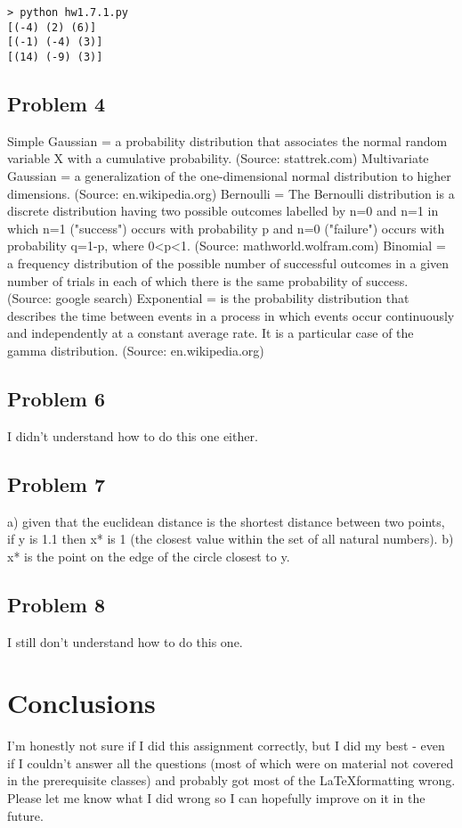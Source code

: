 \documentclass[a4paper]{article}
\begin{document}
\begin{lstlisting}
> python hw1.7.1.py 
[(-4) (2) (6)]
[(-1) (-4) (3)]
[(14) (-9) (3)]
\end{lstlisting}

\subsection{Problem 4}
Simple Gaussian = a probability distribution that associates the normal random variable X with a cumulative probability. (Source: stattrek.com)
Multivariate Gaussian = a generalization of the one-dimensional normal distribution to higher dimensions. (Source: en.wikipedia.org)
Bernoulli = The Bernoulli distribution is a discrete distribution having two possible outcomes labelled by n=0 and n=1 in which n=1 ("success") 
occurs with probability  p and n=0 ("failure") occurs with probability q=1-p, where 0<p<1. (Source: mathworld.wolfram.com)
Binomial = a frequency distribution of the possible number of successful outcomes in a given number of trials in each of which there is the same probability of success. (Source: google search)
Exponential = is the probability distribution that describes the time between events in  
a process in which events occur continuously and independently at a constant average rate. It is a particular case of the gamma distribution. (Source: en.wikipedia.org)

\subsection{Problem 6}
I didn't understand how to do this one either.

\subsection{Problem 7}
a) given that the euclidean distance is the shortest distance between two points, if y is 1.1 then x* is 1 (the closest value within the set of all natural numbers). 
b) x* is the point on the edge of the circle closest to y.

\subsection{Problem 8}
I still don't understand how to do this one.


\section{Conclusions}
I'm honestly not sure if I did this assignment correctly, but I did my best - even if I couldn't answer all the questions (most of which were on material not covered in the prerequisite classes) and probably got most of the \LaTeX formatting wrong. Please let me know what I did wrong so I can hopefully improve on it in the future.
\end{document}
